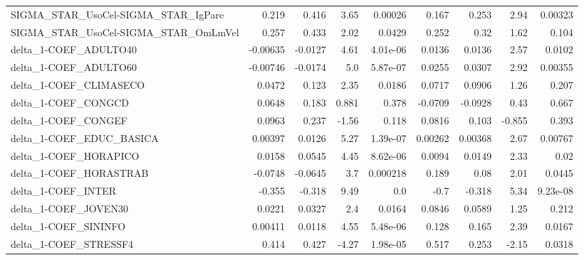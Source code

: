 \begin{tabular}{lrrrrrrrr}
SIGMA\_STAR\_UsoCel-SIGMA\_STAR\_IgPare   &       0.219 &        0.416 &    3.65 &  0.00026 &      0.167 &       0.253 &         2.94 &       0.00323 \\
SIGMA\_STAR\_UsoCel-SIGMA\_STAR\_OmLmVel  &       0.257 &        0.433 &    2.02 &   0.0429 &      0.252 &        0.32 &         1.62 &         0.104 \\
delta\_1-COEF\_ADULTO40                 &    -0.00635 &      -0.0127 &    4.61 & 4.01e-06 &     0.0136 &      0.0136 &         2.57 &        0.0102 \\
delta\_1-COEF\_ADULTO60                 &    -0.00746 &      -0.0174 &     5.0 & 5.87e-07 &     0.0255 &      0.0307 &         2.92 &       0.00355 \\
delta\_1-COEF\_CLIMASECO                &      0.0472 &        0.123 &    2.35 &   0.0186 &     0.0717 &      0.0906 &         1.26 &         0.207 \\
delta\_1-COEF\_CONGCD                   &      0.0648 &        0.183 &   0.881 &    0.378 &    -0.0709 &     -0.0928 &         0.43 &         0.667 \\
delta\_1-COEF\_CONGEF                   &      0.0963 &        0.237 &   -1.56 &    0.118 &     0.0816 &       0.103 &       -0.855 &         0.393 \\
delta\_1-COEF\_EDUC\_BASICA              &     0.00397 &       0.0126 &    5.27 & 1.39e-07 &    0.00262 &     0.00368 &         2.67 &       0.00767 \\
delta\_1-COEF\_HORAPICO                 &      0.0158 &       0.0545 &    4.45 & 8.62e-06 &     0.0094 &      0.0149 &         2.33 &          0.02 \\
delta\_1-COEF\_HORASTRAB                &     -0.0748 &      -0.0645 &     3.7 & 0.000218 &      0.189 &        0.08 &         2.01 &        0.0445 \\
delta\_1-COEF\_INTER                    &      -0.355 &       -0.318 &    9.49 &      0.0 &       -0.7 &      -0.318 &         5.34 &      9.23e-08 \\
delta\_1-COEF\_JOVEN30                  &      0.0221 &       0.0327 &     2.4 &   0.0164 &     0.0846 &      0.0589 &         1.25 &         0.212 \\
delta\_1-COEF\_SININFO                  &     0.00411 &       0.0118 &    4.55 & 5.48e-06 &      0.128 &       0.165 &         2.39 &        0.0167 \\
delta\_1-COEF\_STRESSF4                 &       0.414 &        0.427 &   -4.27 & 1.98e-05 &      0.517 &       0.253 &        -2.15 &        0.0318 \\

\end{tabular}
